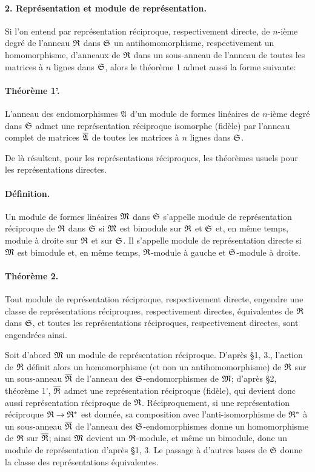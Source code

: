\paragraph{2. Représentation et module de représentation.}
Si l'on entend par représentation réciproque, respectivement directe, de \(n\)-ième degré de l'anneau \(\mathfrak R\) dans \(\mathfrak S\) un antihomomorphisme, respectivement un homomorphisme, d'anneaux de \(\mathfrak R\) dans un sous-anneau de l'anneau de toutes les matrices à \(n\) lignes dans \(\mathfrak S\), alors le théorème 1 admet aussi la forme suivante:

\paragraph{Théorème 1'.}
L'anneau des endomorphismes \(\mathfrak A\) d'un module de formes linéaires de \(n\)-ième degré dans \(\mathfrak S\) admet une représentation réciproque isomorphe (fidèle) par l'anneau complet de matrices \(\overline{\mathfrak A}\) de toutes les matrices à \(n\) lignes dans \(\mathfrak S\).

De là résultent, pour les représentations réciproques, les théorèmes usuels pour les représentations directes.

\paragraph{Définition.}
Un module de formes linéaires \(\mathfrak M\) dans \(\mathfrak S\) s'appelle module de représentation réciproque de \(\mathfrak R\) dans \(\mathfrak S\) si \(\mathfrak M\) est bimodule sur \(\mathfrak R\) et \(\mathfrak S\) et, en même temps, module à droite sur \(\mathfrak R\) et sur \(\mathfrak S\). Il s'appelle module de représentation directe si \(\mathfrak M\) est bimodule et, en même temps, \(\mathfrak R\)-module à gauche et \(\mathfrak S\)-module à droite.

\paragraph{Théorème 2.}
Tout module de représentation réciproque, respectivement directe, engendre une classe de représentations réciproques, respectivement directes, équivalentes de \(\mathfrak R\) dans \(\mathfrak S\), et toutes les représentations réciproques, respectivement directes, sont engendrées ainsi.

Soit d'abord \(\mathfrak M\) un module de représentation réciproque. D'après \S 1, 3., l'action de \(\mathfrak R\) définit alors un homomorphisme (et non un antihomomorphisme) de \(\mathfrak R\) sur un sous-anneau \(\overline{\mathfrak R}\) de l'anneau des \(\mathfrak S\)-endomorphismes de \(\mathfrak M\); d'après \S 2, théorème 1', \(\overline{\mathfrak R}\) admet une représentation réciproque (fidèle), qui devient donc aussi représentation réciproque de \(\mathfrak R\). Réciproquement, si une représentation réciproque \(\mathfrak R\to\mathfrak R^*\) est donnée, sa composition avec l'anti-isomorphisme de \(\mathfrak R^*\) à un sous-anneau \(\overline{\mathfrak R}\) de l'anneau des \(\mathfrak S\)-endomorphismes donne un homomorphisme de \(\mathfrak R\) sur \(\overline{\mathfrak R}\); ainsi \(\mathfrak M\) devient un \(\mathfrak R\)-module, et même un bimodule, donc un module de représentation d'après \S 1, 3. Le passage à d'autres bases de \(\mathfrak S\) donne la classe des représentations équivalentes.

